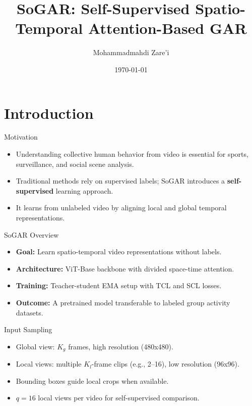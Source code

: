 \documentclass{beamer}
\title{SoGAR: Self-Supervised Spatio-Temporal Attention-Based GAR}
\author{Mohammadmahdi Zare'i}
\date{\today}
\begin{document}
\frame{\titlepage}

\section{Introduction}

\begin{frame}{Motivation}
    \begin{itemize}
        \item Understanding collective human behavior from video is essential for sports, surveillance, and social scene analysis.
        \item Traditional methods rely on supervised labels; SoGAR introduces a \textbf{self-supervised} learning approach.
        \item It learns from unlabeled video by aligning local and global temporal representations.
    \end{itemize}
\end{frame}

\begin{frame}{SoGAR Overview}
    \begin{itemize}
        \item \textbf{Goal:} Learn spatio-temporal video representations without labels.
        \item \textbf{Architecture:} ViT-Base backbone with divided space-time attention.
        \item \textbf{Training:} Teacher-student EMA setup with TCL and SCL losses.
        \item \textbf{Outcome:} A pretrained model transferable to labeled group activity datasets.
    \end{itemize}
\end{frame}


\begin{frame}{Input Sampling}
    \begin{itemize}
        \item Global view: $K_g$ frames, high resolution (480x480).
        \item Local views: multiple $K_l$-frame clips (e.g., 2--16), low resolution (96x96).
        \item Bounding boxes guide local crops when available.
        \item $q=16$ local views per video for self-supervised comparison.
    \end{itemize}
\end{frame}
\end{document}
